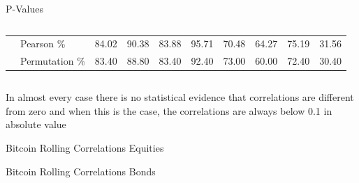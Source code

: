 \documentclass[aspectratio=169]{beamer}
\begin{document}
\begin{frame}{P-Values}
\begin{columns}
\begin{column}{0.5\textwidth}
\begin{table}[H]
{\begin{tabular}{c c | c c c c c c c c}
            & \multicolumn{1}{|l|}{Pearson \%} & 84.02 & 90.38 & 83.88 & 95.71 & 70.48 & 64.27 & 75.19 & 31.56\\
            & \multicolumn{1}{|l|}{Permutation \%} & 83.40 & 88.80 & 83.40 & 92.40 & 73.00 & 60.00 & 72.40 & 30.40\\
            \hline
        \end{tabular}}
    \end{table}
    \end{column}
    \end{columns}

	In almost every case there is no statistical evidence that correlations are different from zero and when this is the case, the correlations are always below 0.1 in absolute value
\end{frame}
\begin{frame}{Bitcoin Rolling Correlations}
Equities
\begin{figure}
	\centering
	\noindent{}
\end{figure}
\end{frame}
\begin{frame}{Bitcoin Rolling Correlations}
Bonds
\begin{figure}
	\centering
	\noindent{}
\end{figure}
\end{frame}
\end{document}
